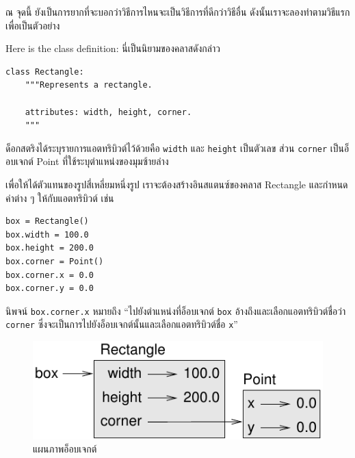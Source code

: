 
ณ จุดนี้ ยังเป็นการยากที่จะบอกว่าวิธีการไหนจะเป็นวิธีการที่ดีกว่าวิธีอื่น ดังนั้นเราจะลองทำตามวิธีแรกเพื่อเป็นตัวอย่าง


Here is the class definition:
นี่เป็นนิยามของคลาสดังกล่าว

\begin{verbatim}
class Rectangle:
    """Represents a rectangle. 

    attributes: width, height, corner.
    """
\end{verbatim}
%

ด็อกสตริงได้ระบุรายการแอตทริบิวต์ไว้ด้วยคือ {\tt width} และ {\tt height} เป็นตัวเลข 
ส่วน {\tt corner} เป็นอ็อบเจกต์ Point ที่ใช้ระบุตำแหน่งของมุมซ้ายล่าง

เพื่อให้ได้ตัวแทนของรูปสี่เหลี่ยมหนึ่งรูป เราจะต้องสร้างอินสแตนซ์ของคลาส Rectangle และกำหนดค่าต่าง ๆ ให้กับแอตทริบิวต์ เช่น

\begin{verbatim}
box = Rectangle()
box.width = 100.0
box.height = 200.0
box.corner = Point()
box.corner.x = 0.0
box.corner.y = 0.0
\end{verbatim}
%

นิพจน์ {\tt box.corner.x} หมายถึง
``ไปยังตำแหน่งที่อ็อบเจกต์ {\tt box} อ้างถึงและเลือกแอตทริบิวต์ชื่อว่า {\tt corner} ซึ่งจะเป็นการไปยังอ็อบเจกต์นั้นและเลือกแอตทริบิวต์ชื่อ {\tt x}''

\begin{figure}
\centerline
{\includegraphics[scale=0.8]{figs/rectangle.pdf}}
\caption{แผนภาพอ็อบเจกต์}
\label{fig.rectangle}
\end{figure}


